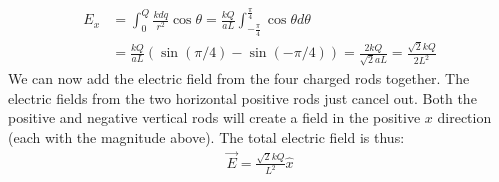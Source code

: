 \begin{solution}
	\begin{align*}
	E_x &= \int_0^Q\frac{kdq}{r^2}\cos\theta = \frac{kQ}{aL}\int_{-\frac{\pi}{4}}^{\frac{\pi}{4}}\cos\theta d\theta\\
	&=\frac{kQ}{aL}(\sin(\pi/4)-\sin(-\pi/4))=\frac{2kQ}{\sqrt{2}aL}=\frac{\sqrt{2}kQ}{2L^2}
	\end{align*}
	We can now add the electric field from the four charged rods together. The electric fields from the two horizontal positive rods just cancel out. Both the positive and negative vertical rods will create a field in the positive $x$ direction (each with the magnitude above). The total electric field is thus:
	\begin{align*}
	\vec E = \frac{\sqrt{2}kQ}{L^2}\hat x 
	\end{align*}
\end{solution}








